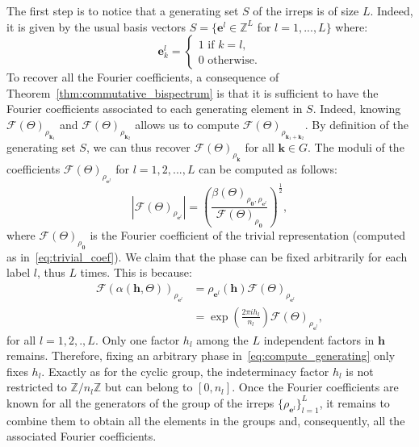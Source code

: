 \documentclass{article}
\theoremstyle{plain}
\theoremstyle{definition}
\theoremstyle{remark}
\newcommand{\kbf}{\mathbf{k}}
\newcommand{\ebf}{\mathbf{e}}
\begin{document}

The first step is to notice that a generating set $S$ of the irreps is of size $L$. Indeed, it is given by the usual basis vectors $S=\{\ebf^l\in \mathbb{Z}^L$ for $l=1,...,L\}$ where:
\begin{equation*}
    \ebf^l_k=\begin{cases}
        1 \text{ if } k=l,\\
        0 \text{ otherwise.}
    \end{cases}
\end{equation*}
To recover all the Fourier coefficients, a consequence of Theorem~\ref{thm:commutative_bispectrum} is that it is sufficient to have the Fourier coefficients associated to each generating element in $S$. Indeed, knowing $\mathcal{F}(\Theta)_{\rho_{\kbf_1}}$ and $\mathcal{F}(\Theta)_{\rho_{\kbf_2}}$ allows us to compute $\mathcal{F}(\Theta)_{\rho_{\kbf_1+\kbf_2}}$. By definition of the generating set $S$, we can thus recover $\mathcal{F}(\Theta)_{\rho_{\kbf}}$ for all $\kbf \in G$. The moduli of the coefficients $\mathcal{F}(\Theta)_{\rho_{\ebf^l}}$ for $l=1,2,...,L$ can be computed as follows:
\begin{equation}\label{eq:compute_generating}
    |\mathcal{F}(\Theta)_{\rho_{\ebf^l}}| =\left(\frac{\beta(\Theta)_{\rho_\mathbf{0},\rho_{\ebf^l}}}{\mathcal{F}(\Theta)_{\rho_\mathbf{0}}}\right)^\frac{1}{2},
\end{equation}
where $\mathcal{F}(\Theta)_{\rho_\mathbf{0}}$ is the Fourier coefficient of the trivial representation (computed as in~\eqref{eq:trivial_coef}). We claim that the phase can be fixed arbitrarily for each label $l$, thus $L$ times. This is because:
\begin{align*}
    \mathcal{F}(\alpha(\mathbf{h},\Theta))_{\rho_{\ebf^l}} &= \rho_{\ebf^l}(\mathbf{h})\mathcal{F}(\Theta)_{\rho_{\ebf^l}}\\
    &=\exp\left(\frac{2\pi i h_l}{n_l}\right)\mathcal{F}(\Theta)_{\rho_{\ebf^l}},
\end{align*}
for all $l=1,2,.,L$. Only one factor $h_l$ among the $L$ independent factors in $\mathbf{h}$ remains. Therefore, fixing an arbitrary phase in~\eqref{eq:compute_generating} only fixes $h_l$. Exactly as for the cyclic group, the indeterminacy factor $h_l$ is not restricted to $\mathbb{Z}/n_l\mathbb{Z}$ but can belong to $[0,n_l]$. Once the Fourier coefficients are known for all the generators of the group of the irreps $\{\rho_{\ebf^l}\}_{l=1}^L$, it remains to combine them to obtain all the elements in the groups and, consequently, all the associated Fourier coefficients.
\end{document}
